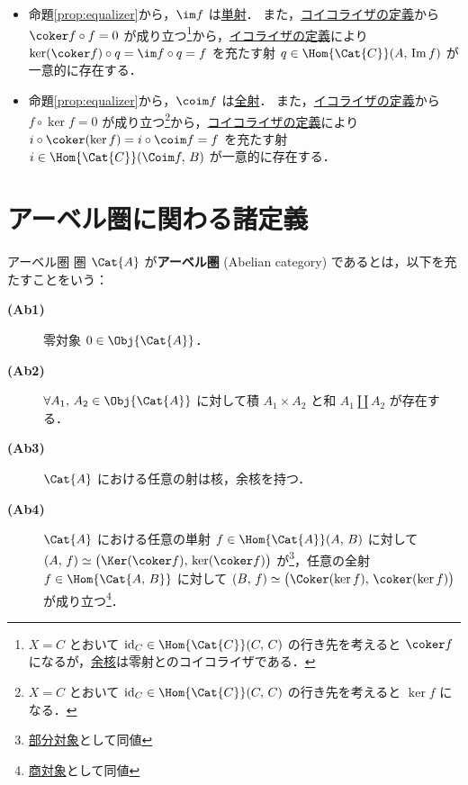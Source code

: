 \documentclass[algtopo_main]{subfiles}
\begin{document}
\begin{marker}
    \begin{itemize}
        \item 命題\ref{prop:equalizer}から，$\im f$ は\hyperref[def:mono-epi]{単射}．
        また，\hyperref[def:coequalizer]{コイコライザの定義}から $\coker f \circ f = 0$ が成り立つ\footnote{$X = C$ とおいて $\mathrm{id}_C \in \Hom{\Cat{C}} (C,\, C)$ の行き先を考えると $\coker f$ になるが，\hyperref[def:ker-coker]{余核}は零射とのコイコライザである．}から，\hyperref[def:equalizer]{イコライザの定義}により $\ker (\coker f) \circ q = \im f \circ q = f$ を充たす射 $q \in \Hom{\Cat{C}} (A,\, \Im f)$ が一意的に存在する．
        \item 命題\ref{prop:equalizer}から，$\coim f$ は\hyperref[def:mono-epi]{全射}．
        また，\hyperref[def:equalizer]{イコライザの定義}から $f \circ \ker f = 0$ が成り立つ\footnote{$X = C$ とおいて $\mathrm{id}_C \in \Hom{\Cat{C}} (C,\, C)$ の行き先を考えると $\ker f$ になる．}から，\hyperref[def:coequalizer]{コイコライザの定義}により $i \circ \coker (\ker f) = i \circ \coim f = f$ を充たす射 $i \in \Hom{\Cat{C}} (\Coim f,\, B)$ が一意的に存在する．
    \end{itemize}
\end{marker}



\section{アーベル圏に関わる諸定義}

\begin{mydef}[label=def:Abel]{アーベル圏}
    圏 $\Cat{A}$ が\textbf{アーベル圏} (Abelian category) であるとは，以下を充たすことをいう：
    \begin{description}
        \item[\textbf{(Ab1)}] 零対象 $0 \in \Obj{\Cat{A}}$．
        \item[\textbf{(Ab2)}] $\forall A_1,\, A_2 \in \Obj{\Cat{A}}$ に対して積 $A_1 \times A_2$ と和 $A_1 \amalg A_2$ が存在する．
        \item[\textbf{(Ab3)}] $\Cat{A}$ における任意の射は核，余核を持つ．
        \item[\textbf{(Ab4)}] $\Cat{A}$ における任意の単射 $f \in\Hom{\Cat{A}}(A,\, B)$ に対して $(A,\, f) \simeq \bigl(\Ker (\coker f),\, \ker (\coker f)\bigr)$ が\footnote{\hyperref[def:sub]{部分対象}として同値}，任意の全射 $f \in \Hom{\Cat{A,\, B}}$ に対して $(B,\, f) \simeq \bigl(\Coker (\ker f),\, \coker (\ker f)\bigr)$ が成り立つ\footnote{\hyperref[def:quo]{商対象}として同値}．
    \end{description}
\end{mydef}
\end{document}
